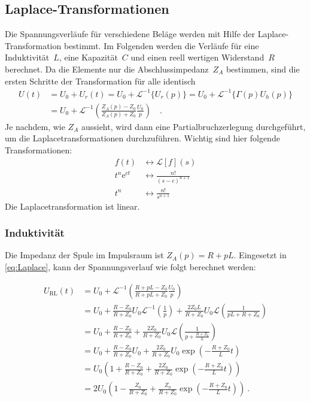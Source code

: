 \subsection{Laplace-Transformationen} \label{seq:laplace}
Die Spannungsverläufe für verschiedene Beläge werden mit Hilfe der Laplace-Trans\-for\-ma\-tion bestimmt. Im Folgenden werden die Verläufe für eine Induktivität~$L$, eine Kapazität~$C$ und einen reell wertigen Widerstand~$R$ berechnet. Da die Elemente nur die Abschlussimpedanz~$Z_A$ bestimmen, sind die ersten Schritte der Transformation für alle identisch
\begin{align}
	U(t) &= U_0 + U_r(t) = U_0 + \mathcal{L}^{-1} \{U_r(p) \} 
	= U_0 + \mathcal{L}^{-1} \{\Gamma(p) U_h(p) \} \\
&= U_0 + \mathcal{L}^{-1}\left(\frac{Z_A(p)-Z_0}{Z_A(p)+Z_0}\frac{U_0}{p}\right) \quad .\label{eq:Laplace}
\end{align}
Je nachdem, wie $Z_A$ aussieht, wird dann eine Partialbruchzerlegung durchgeführt, um die Laplacetransformationen durchzuführen. Wichtig sind hier folgende Transformationen:
\begin{align}
	f(t) &\leftrightarrow \mathcal{L}[f](s)  \\
	t^n\textrm{e}^{ct} &\leftrightarrow \frac{n!}{(s-c)^{n+1}} \\
	t^n &\leftrightarrow \frac{n!}{s^{n+1}}
\end{align}
Die Laplacetransformation ist linear.
\subsubsection{Induktivität}
Die Impedanz der Spule im Impulsraum ist $Z_A(p) = R + pL$. Eingesetzt in \eqref{eq:Laplace}, kann der Spannungsverlauf wie folgt berechnet werden:

\begin{align*}
	U_\text{RL}(t) 
	&= U_0 + \mathcal{L}^{-1}\left(\frac{R+pL-Z_0}{R+pL+Z_0}\frac{U_0}{p}\right) \\
	 &= U_0 + \frac{R-Z_0}{R+Z_0}U_0\mathcal{L}^{-1}\left(\frac{1}{p}\right) + \frac{2Z_0L}{R+Z_0}U_0\mathcal{L}\left(\frac{1}{pL+R+Z_0}\right) \\
	 	 &= U_0 + \frac{R-Z_0}{R+Z_0} + \frac{2Z_0}{R+Z_0}U_0\mathcal{L}\left(\frac{1}{p+\frac{R+Z_0}{L}}\right) \\
	&= U_0 + \frac{R-Z_0}{R+Z_0}U_0 + \frac{2Z_0}{R+Z_0}U_0\exp\left(-\frac{R+Z_0}{L}t\right) \\
	&= U_0\left(1 + \frac{R-Z_0}{R+Z_0} + \frac{2Z_0}{R+Z_0}\exp\left(-\frac{R+Z_0}{L}t\right)\right) \\
		&= 2U_0\left(1 - \frac{Z_0}{R+Z_0} + \frac{Z_0}{R+Z_0}\exp\left(-\frac{R+Z_0}{L}t\right)\right) \ .
\end{align*}
\clearpage
